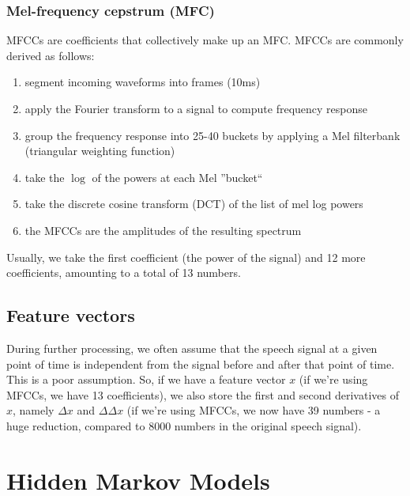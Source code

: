 \subsubsection{Mel-frequency cepstrum (MFC)}

MFCCs are coefficients that collectively make up an MFC. 
MFCCs are commonly derived as follows:

\begin{enumerate}
    \item segment incoming waveforms into frames (10ms)
    \item apply the Fourier transform to a signal to compute frequency response
    \item group the frequency response into 25-40 buckets by applying a Mel filterbank (triangular weighting function)
    \item take the $\log$ of the powers at each Mel ''bucket``
    \item take the discrete cosine transform (DCT) of the list of mel log powers
    \item the MFCCs are the amplitudes of the resulting spectrum
\end{enumerate}

Usually, we take the first coefficient (the power of the signal) and 12 more coefficients, amounting to a total of 13 numbers.

\subsection{Feature vectors}

During further processing, we often assume that the speech signal at a given point of time is independent from the signal before and after that point of time. This is a poor assumption. So, if we have a feature vector $x$ (if we're using MFCCs, we have 13 coefficients), we also store the first and second derivatives of $x$, namely $\Delta x$ and $\Delta \Delta x$ (if we're using MFCCs, we now have 39 numbers - a huge reduction, compared to 8000 numbers in the original speech signal).

\newpage

\section{Hidden Markov Models}

